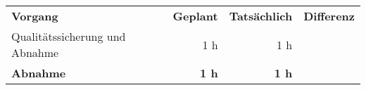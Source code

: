 \begin{tabular}{lrrr}
\rowcolor{heading}\textbf{Vorgang} & \textbf{Geplant} & \textbf{Tatsächlich} & \textbf{Differenz} \\
Qualitätssicherung und Abnahme & 1 h & 1 h   &  \\
\hline
\hline
\rowcolor{heading}\textbf{Abnahme} & \textbf{1 h} & \textbf{1 h} & \textbf{} \\
\end{tabular}
